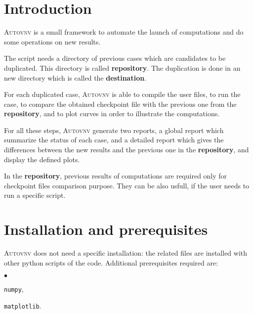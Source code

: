 \documentclass[a4paper,10pt,twoside]{article}
\begin{document}
\def\contentsname{\textbf{\normalsize TABLE OF CONTENTS}\pdfbookmark[1]{Table of
contents}{contents}}

\large
\makepdgCS
\normalsize

\passepage

\begin{center}\begin{singlespace}
\tableofcontents
\end{singlespace}\end{center}
%
\section{Introduction}

\textsc{Autovnv} is a small framework to automate the launch of \CS computations
and do some operations on new results.

The script needs a directory of previous \CS cases which are candidates to be duplicated.
This directory is called \textbf{repository}. The duplication is done in an new directory
which is called the \textbf{destination}.

For each duplicated case, \textsc{Autovnv} is able to compile the user files,
to run the case, to compare the obtained checkpoint file with the previous one
from the \textbf{repository}, and to plot curves in order to illustrate the computations.

For all these steps, \textsc{Autovnv} generate two reports, a global report which summarize
the status of each case, and a detailed report which gives the differences between the new results
and the previous one in the \textbf{repository}, and display the defined plots.

In the \textbf{repository}, previous results of computations are required only for checkpoint
files comparison purpose. They can be also usfull, if the user needs to run a specific script.

\section{Installation and prerequisites}

\textsc{Autovnv} does not need a specific installation: the related files are installed
with other python scripts of the code. Additional prerequisites required are:
\begin{list}{$\bullet$}{}
\item \texttt{numpy},
\item \texttt{matplotlib}.
\end{list}
\end{document}
